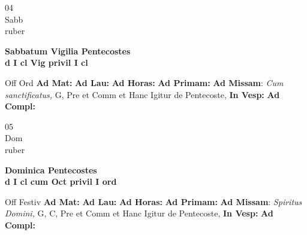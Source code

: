 \documentclass[10pt, openany]{book}
\begin{document}
    \begin{center}
        \begin{minipage}{3.5in}
            \vspace{2em}
            \begin{minipage}{0.5in}
                {\Huge 04} \\
                {\normalsize Sabb} \\
                {\normalsize ruber}
            \end{minipage}
            \begin{minipage}{3.0in}
                \textbf{ \large Sabbatum Vigilia Pentecostes \\
                \textnormal{\normalsize d I cl Vig privil I cl}} \\ 
            \end{minipage}
            \begin{justify}Off Ord
                \textbf{Ad Mat: }
                \textbf{Ad Lau: }
                \textbf{Ad Horas: }
                \textbf{Ad Primam: }\textbf{Ad Missam}: \textit{Cum sanctificatus,} G, Pre et Comm et Hanc Igitur de Pentecoste,  
                \textbf{In Vesp: }
                \textbf{Ad Compl: }
            \end{justify}
        \end{minipage}
    \end{center}

    \begin{center}
        \begin{minipage}{3.5in}
            \vspace{2em}
            \begin{minipage}{0.5in}
                {\Huge 05} \\
                {\normalsize Dom} \\
                {\normalsize ruber}
            \end{minipage}
            \begin{minipage}{3.0in}
                \textbf{ \large Dominica Pentecostes \\
                \textnormal{\normalsize d I cl cum Oct privil I ord}} \\ 
            \end{minipage}
            \begin{justify}Off Festiv
                \textbf{Ad Mat: }
                \textbf{Ad Lau: }
                \textbf{Ad Horas: }
                \textbf{Ad Primam: }\textbf{Ad Missam}: \textit{Spiritus Domini,} G, C, Pre et Comm et Hanc Igitur de Pentecoste,  
                \textbf{In Vesp: }
                \textbf{Ad Compl: }
            \end{justify}
        \end{minipage}
    \end{center}
\end{document}

